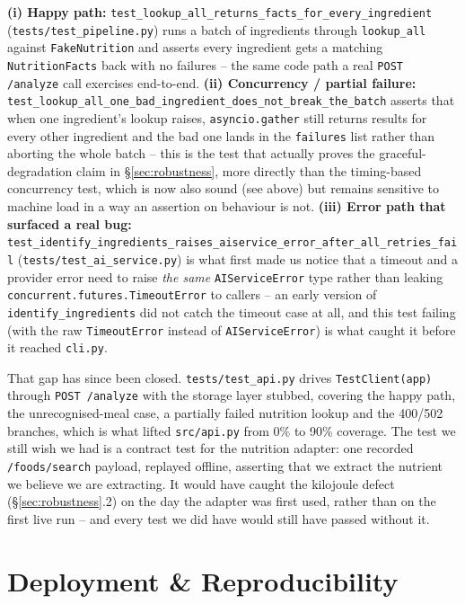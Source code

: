 \documentclass[11pt,a4paper]{article}
\begin{document}
\textbf{(i) Happy path:} \texttt{test\_lookup\_all\_returns\_facts\_for\_every\_ingredient} (\texttt{tests/test\_pipeline.py}) runs a batch of ingredients through \texttt{lookup\_all} against \texttt{FakeNutrition} and asserts every ingredient gets a matching \texttt{NutritionFacts} back with no failures -- the same code path a real \texttt{POST /analyze} call exercises end-to-end. \textbf{(ii) Concurrency / partial failure:} \texttt{test\_lookup\_all\_one\_bad\_ingredient\_does\_not\_break\_the\_batch} asserts that when one ingredient's lookup raises, \texttt{asyncio.gather} still returns results for every other ingredient and the bad one lands in the \texttt{failures} list rather than aborting the whole batch -- this is the test that actually proves the graceful-degradation claim in \S\ref{sec:robustness}, more directly than the timing-based concurrency test, which is now also sound (see above) but remains sensitive to machine load in a way an assertion on behaviour is not. \textbf{(iii) Error path that surfaced a real bug:} \texttt{test\_identify\_ingredients\_raises\_aiservice\_error\_after\_all\_retries\_fail} (\texttt{tests/test\_ai\_service.py}) is what first made us notice that a timeout and a provider error need to raise \emph{the same} \texttt{AIServiceError} type rather than leaking \texttt{concurrent.futures.TimeoutError} to callers -- an early version of \texttt{identify\_ingredients} did not catch the timeout case at all, and this test failing (with the raw \texttt{TimeoutError} instead of \texttt{AIServiceError}) is what caught it before it reached \texttt{cli.py}.

That gap has since been closed. \texttt{tests/test\_api.py} drives \texttt{TestClient(app)} through \texttt{POST /analyze} with the storage layer stubbed, covering the happy path, the unrecognised-meal case, a partially failed nutrition lookup and the 400/502 branches, which is what lifted \texttt{src/api.py} from 0\% to 90\% coverage. The test we still wish we had is a contract test for the nutrition adapter: one recorded \texttt{/foods/search} payload, replayed offline, asserting that we extract the nutrient we believe we are extracting. It would have caught the kilojoule defect (\S\ref{sec:robustness}.2) on the day the adapter was first used, rather than on the first live run -- and every test we did have would still have passed without it.

\section{Deployment \& Reproducibility}\label{sec:deploy}
\end{document}
